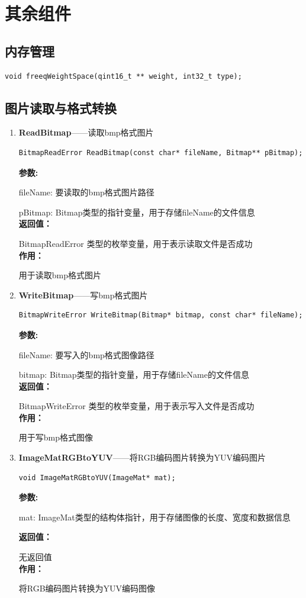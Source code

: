 \documentclass[12pt, a4paper, oneside]{ctexbook}
\begin{document}
	\section{其余组件}
		\subsection{内存管理}
		\begin{lstlisting}[numbers=none]
void freeqWeightSpace(qint16_t ** weight, int32_t type);
		\end{lstlisting}
		\subsection{图片读取与格式转换}

		\begin{enumerate}
			\item \textbf{ReadBitmap}——读取bmp格式图片
				\begin{lstlisting}[numbers=none]
BitmapReadError ReadBitmap(const char* fileName, Bitmap** pBitmap);
				\end{lstlisting}
				\textbf{参数:} \par fileName: 要读取的bmp格式图片路径 \par pBitmap: Bitmap类型的指针变量，用于存储fileName的文件信息 \\
				\textbf{返回值：}\par BitmapReadError 类型的枚举变量，用于表示读取文件是否成功\\
				\textbf{作用：}\par 用于读取bmp格式图片\\
			
			\item \textbf{WriteBitmap}——写bmp格式图片
				\begin{lstlisting}[numbers=none]
BitmapWriteError WriteBitmap(Bitmap* bitmap, const char* fileName);
				\end{lstlisting}
				\textbf{参数:} \par fileName: 要写入的bmp格式图像路径 \par bitmap: Bitmap类型的指针变量，用于存储fileName的文件信息 \\
				\textbf{返回值：}\par BitmapWriteError 类型的枚举变量，用于表示写入文件是否成功\\
				\textbf{作用：}\par 用于写bmp格式图像\\
			
			\item \textbf{ImageMatRGBtoYUV}——将RGB编码图片转换为YUV编码图片
				\begin{lstlisting}[numbers=none]
void ImageMatRGBtoYUV(ImageMat* mat);
				\end{lstlisting}
				\textbf{参数:} \par mat: ImageMat类型的结构体指针，用于存储图像的长度、宽度和数据信息\par 
				\textbf{返回值：}\par 无返回值 \\
				\textbf{作用：}\par  将RGB编码图片转换为YUV编码图像\\


\end{enumerate}
\end{document}
